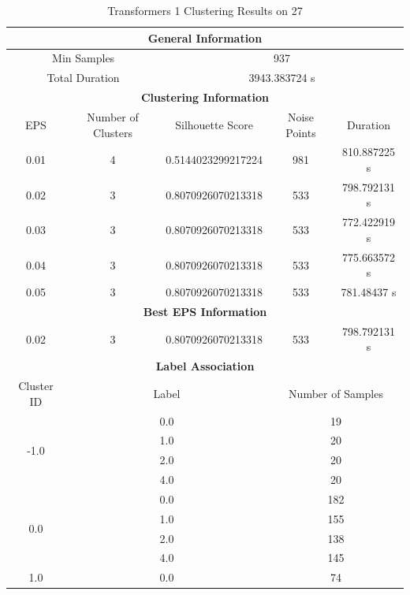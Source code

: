 \begin{longtable}{|c|c|c|c|c|}
\caption{Transformers 1 Clustering Results on 27} \label{tab:27_transformers_1_clustering_results}\\
\hline
\multicolumn{5}{|c|}{\textbf{General Information}} \\
\hline
\multicolumn{2}{|c|}{Min Samples} & \multicolumn{3}{c|}{937} \\
\multicolumn{2}{|c|}{Total Duration} & \multicolumn{3}{c|}{3943.383724 s} \\
\hline
\multicolumn{5}{|c|}{\textbf{Clustering Information}} \\
\hline
EPS & Number of Clusters & Silhouette Score & Noise Points & Duration \\
0.01 & 4 & 0.5144023299217224 & 981 & 810.887225 s\\
0.02 & 3 & 0.8070926070213318 & 533 & 798.792131 s\\
0.03 & 3 & 0.8070926070213318 & 533 & 772.422919 s\\
0.04 & 3 & 0.8070926070213318 & 533 & 775.663572 s\\
0.05 & 3 & 0.8070926070213318 & 533 & 781.48437 s\\
\hline
\multicolumn{5}{|c|}{\textbf{Best EPS Information}} \\
\hline
0.02 & 3 & 0.8070926070213318 & 533 & 798.792131 s\\
\hline
\multicolumn{5}{|c|}{\textbf{Label Association}} \\
\hline
Cluster ID & \multicolumn{2}{c|}{Label} & \multicolumn{2}{c|}{Number of Samples} \\
\hline
\multirow{4}{*}{-1.0} & \multicolumn{2}{c|}{0.0} & \multicolumn{2}{c|}{19} \\
& \multicolumn{2}{c|}{1.0} & \multicolumn{2}{c|}{20} \\
& \multicolumn{2}{c|}{2.0} & \multicolumn{2}{c|}{20} \\
& \multicolumn{2}{c|}{4.0} & \multicolumn{2}{c|}{20} \\
\hline
\multirow{4}{*}{0.0} & \multicolumn{2}{c|}{0.0} & \multicolumn{2}{c|}{182} \\
& \multicolumn{2}{c|}{1.0} & \multicolumn{2}{c|}{155} \\
& \multicolumn{2}{c|}{2.0} & \multicolumn{2}{c|}{138} \\
& \multicolumn{2}{c|}{4.0} & \multicolumn{2}{c|}{145} \\
\hline
\multirow{4}{*}{1.0} & \multicolumn{2}{c|}{0.0} & \multicolumn{2}{c|}{74} \\

\end{longtable}
